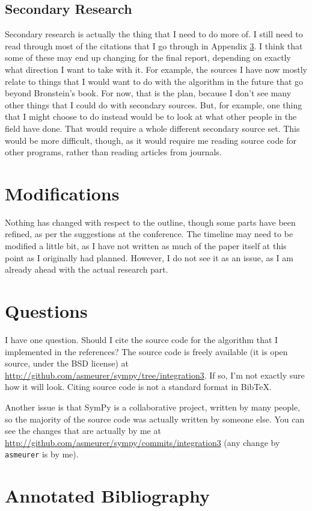 \documentclass[12pt]{article}
\newcommand{\BibTeX}{{\sc Bib}\TeX}
\begin{document}
\subsection{Secondary Research}
Secondary research is actually the thing that I need to do more of. I
still need to read through most of the citations that I go through in
Appendix \ref{annotated-bib}.  I think that some of these may end up
changing for the final report, depending on exactly what direction I
want to take with it.  For example, the sources I have now mostly relate
to things that I would want to do with the algorithm in the future that
go beyond Bronstein's book.  For now, that is the plan, because I don't
see many other things that I could do with secondary sources.  But, for
example, one thing that I might choose to do instead would be to look at
what other people in the field have done.  That would require a whole
different secondary source set.  This would be more difficult, though,
as it would require me reading source code for other programs, rather
than reading articles from journals.

\section{Modifications}
Nothing has changed with respect to the outline, though some parts have
been refined, as per the suggestions at the conference.  The timeline
may need to be modified a little bit, as I have not written as much of
the paper itself at this point as I originally had planned.  However, I
do not see it as an issue, as I am already ahead with the actual
research part.

\section{Questions}
I have one question.  Should I cite the source code for the algorithm
that I implemented in the references?  The source code is freely
available (it is open source, under the BSD license) at
\url{http://github.com/asmeurer/sympy/tree/integration3}.  If so, I'm
not exactly sure how it will look.  Citing source code is not a standard
format in \BibTeX.  

Another issue is that Sym\-Py is a collaborative project, written by many
people, so the majority of the source code was actually written by
someone else.  You can see the changes that are actually by me at
\url{http://github.com/asmeurer/sympy/commits/integration3} (any change
by \texttt{asmeurer} is by me).

\appendix
\section{Annotated Bibliography}
\label{annotated-bib}

\nocite{*}


\end{document}
